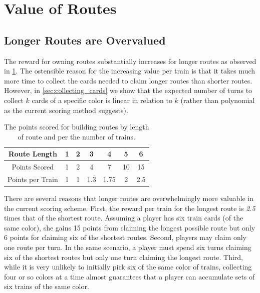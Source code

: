\section{Value of Routes}
\label{sec:routes}
\subsection{Longer Routes are Overvalued}
\label{sec:overvalued}
The reward for owning routes substantially 
increases for longer routes as observed in 
\cref{table:current_value}.
The ostensible reason for the 
increasing value per train is that
it takes much more time to collect
the cards needed to claim longer
routes than shorter routes.
However, in \cref{sec:collecting_cards} we show that the expected 
number of turns to collect $k$ cards of a specific
color is linear in relation to $k$
(rather than polynomial as the current scoring method suggests).

\begin{table}[H]
    \renewcommand{\arraystretch}{1.5}
    \centering
    \begin{tabular}{| c | c | c | c | c | c | c |}
    \hline
     Route Length & 1 & 2 & 3 & 4 & 5 & 6\\
     \hline
     Points Scored & 1 & 2 & 4 & 7 & 10 & 15\\
     \hline
     Points per Train & 1 & 1 & $1.\overline{3}$ & 1.75 & 2 & 2.5\\
     \hline
    \end{tabular}
    \vspace{.5cm}
    \caption{The points scored for building routes by length of route
    and per the number of trains.}
    \vspace{-.75cm}
    \label{table:current_value}
\end{table}

There are several reasons that longer routes are
overwhelmingly more valuable in the current scoring scheme.
First, the reward per train for the longest route is \textit{2.5}
times that of the shortest route.
Assuming a player has six train cards (of the same color),
she gains 15 points from claiming the longest possible route but only
6 points for claiming six of the shortest routes.
Second, players may claim only one route per turn.
In the same scenario, a player must spend six turns
claiming six of the shortest routes but only one turn
claiming the longest route.
Third, while it is very unlikely to initially pick six of the same
color of trains, collecting four or so colors at a time almost
guarantees that a player can accumulate sets of six trains
of the same color.

